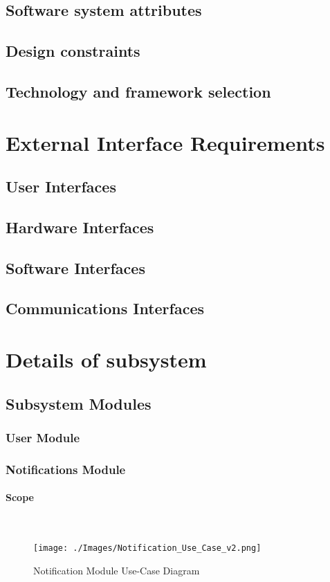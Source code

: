 \documentclass{article}
\begin{document}
		\subsection{Software system attributes}
		\subsection{Design constraints}
		\subsection{Technology and framework selection}
		
		
	\section{External Interface Requirements}
		\subsection{User Interfaces}
		\subsection{Hardware Interfaces}
		\subsection{Software Interfaces}
		\subsection{Communications Interfaces}
		
	\newpage	
	\section{Details of subsystem}
	\subsection{Subsystem Modules}
		\subsubsection{User Module}
		\subsubsection{Notifications Module}
			\paragraph	{Scope}\mbox{} \\
				\begin{figure}[h]
					\texttt{[image: ./Images/Notification\_Use\_Case\_v2.png]} 
					\caption{Notification Module Use-Case Diagram}
				\end{figure}
			
\end{document}
